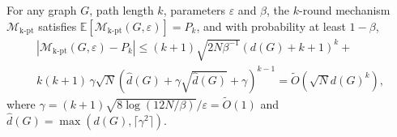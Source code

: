 \begin{theorem}
    For any graph $G$, path length $k$, parameters $\varepsilon$ and $\beta$, the $k$-round mechanism $\mathcal{M}_{\mathrm{k\text{-}pt}}$ satisfies $
    \mathbb{E}[\mathcal{M}_{\mathrm{k\text{-}pt}}(G, \varepsilon)] =  
    P_k$,
and with probability at least $1 - \beta$,
\begin{align*}
    |\mathcal{M}_{\mathrm{k\text{-}pt}}(G, \varepsilon) - 
    P_k|  \leq  (k+1) \sqrt{2N\beta^{-1}}(d(G)+k+1)^k + \\ 
          {k(k+1)} \, 
        \gamma
        \sqrt{N}
        (\hat{d}(G) + \gamma \sqrt{\hat{d}(G)} + \gamma)^{k-1} 
          =  \tilde{O}(\sqrt{N} d(G)^{k}),
\end{align*}
where $\gamma = (k+1)\sqrt{8\log(12N/\beta)}/\varepsilon = \tilde{O}(1) $ and $\hat{d}(G) = \max(d(G), \lceil\gamma^2\rceil)$.
\end{theorem}




